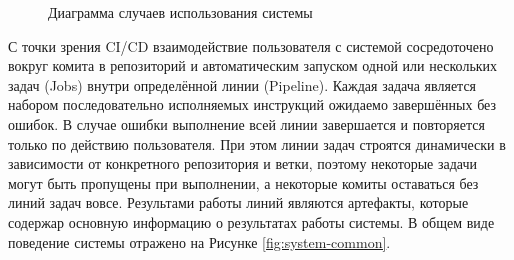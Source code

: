 \begin{figure}[h!]
    \centering
    \caption{Диаграмма случаев использования системы}
    \label{fig:use-cases}
\end{figure}

С точки зрения CI/CD взаимодействие пользователя с системой сосредоточено вокруг комита в репозиторий и автоматическим запуском
одной или нескольких задач (Jobs) внутри определённой линии (Pipeline).
Каждая задача является набором последовательно исполняемых инструкций ожидаемо завершённых без ошибок.
В случае ошибки выполнение всей линии завершается и повторяется только по действию пользователя.
При этом линии задач строятся динамически в зависимости от конкретного репозитория и ветки, поэтому некоторые задачи могут быть пропущены при выполнении,
а некоторые комиты оставаться без линий задач вовсе.
Результами работы линий являются артефакты, которые содержар основную информацию о результатах работы системы.
В общем виде поведение системы отражено на Рисунке \ref{fig:system-common}.

